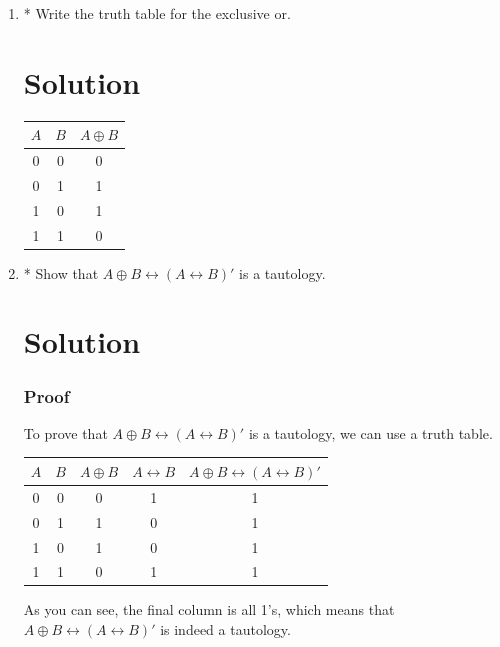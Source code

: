 \documentclass[12pt]{article}
\begin{document}
\begin{enumerate}
  \item* Write the truth table for the exclusive or.
  \section*{Solution}
  \begin{center}
    \begin{tabular}{|c|c|c|}
      \hline
      \( A \) & \( B \) & \( A \oplus B \) \\
      \hline
      0 & 0 & 0 \\
      0 & 1 & 1 \\
      1 & 0 & 1 \\
      1 & 1 & 0 \\
      \hline
    \end{tabular}
  \end{center}

  \item* Show that \( A \oplus B \leftrightarrow (A \leftrightarrow B)' \) is a tautology.
  \section*{Solution}
  \subsubsection*{Proof}
  To prove that \( A \oplus B \leftrightarrow (A \leftrightarrow B)' \) is a tautology, we can use a truth table.

  \begin{center}
    \begin{tabular}{|c|c|c|c|c|}
      \hline
      \( A \) & \( B \) & \( A \oplus B \) & \( A \leftrightarrow B \) & \( A \oplus B \leftrightarrow (A \leftrightarrow B)' \) \\
      \hline
      0 & 0 & 0 & 1 & 1 \\
      0 & 1 & 1 & 0 & 1 \\
      1 & 0 & 1 & 0 & 1 \\
      1 & 1 & 0 & 1 & 1 \\
      \hline
    \end{tabular}
  \end{center}

  As you can see, the final column is all 1's, which means that \( A \oplus B \leftrightarrow (A \leftrightarrow B)' \) is indeed a tautology.
\end{enumerate}
\end{document}
